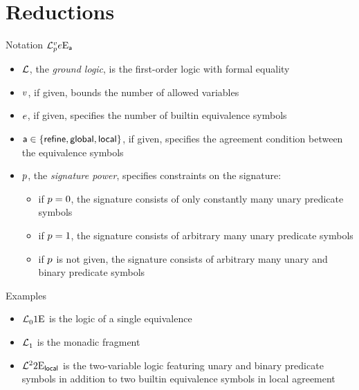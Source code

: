 \documentclass{beamer}
\begin{document}
\section{Reductions}
\begin{frame}{Notation}
$\mathcal{L}^{v}_{p}{e}\mathrm{E}_{\mathsf{a}}$
\begin{itemize}
  \item $\mathcal{L}$, the \emph{ground logic}, is the first-order logic with formal
  equality
  \item $v$, if given, bounds the number of allowed variables
  \item $e$, if given, specifies the number of builtin equivalence symbols
  \item $\mathsf{a}\in\left\{\mathsf{refine},\mathsf{global},\mathsf{local}\right\}$, if given, specifies the
  agreement condition between the equivalence symbols
  \item $p$, the \emph{signature power}, specifies constraints on the
  signature:
  \begin{itemize}
    \item if $p = 0$, the signature consists of only constantly many unary
    predicate symbols
    \item if $p = 1$, the signature consists of arbitrary many unary
    predicate symbols
    \item if $p$ is not given, the signature consists of arbitrary many unary
    and binary predicate symbols
  \end{itemize}
\end{itemize}
\end{frame}

\begin{frame}{Examples}
\begin{itemize}
  \item $\mathcal{L}^{{}}_{0}{1}\mathrm{E}_{{}}$ is the logic of a single equivalence
  \item $\mathcal{L}^{{}}_{1}$ is the monadic fragment
  \item $\mathcal{L}^{2}_{{}}{2}\mathrm{E}_{\mathsf{local}}$ is the two-variable logic featuring unary
  and binary predicate symbols in addition to two builtin equivalence symbols in
  local agreement
\end{itemize}
\end{frame}
\end{document}
